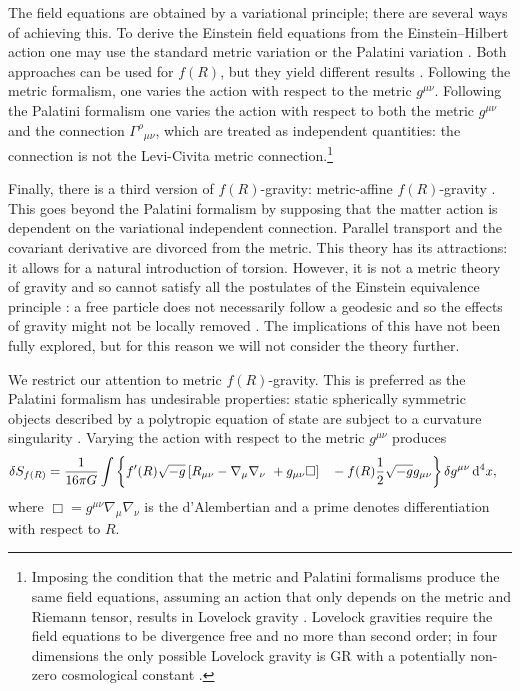 The field equations are obtained by a variational principle; there are several ways of achieving this. To derive the Einstein field equations from the Einstein--Hilbert action one may use the standard metric variation or the Palatini variation \citep[section 21.2]{Misner1973}. Both approaches can be used for $f(R)$, but they yield different results \citep{Sotiriou2010, DeFelice2010}. Following the metric formalism, one varies the action with respect to the metric $g^{\mu\nu}$. Following the Palatini formalism one varies the action with respect to both the metric $g^{\mu\nu}$ and the connection ${\Gamma^\rho}_{\mu\nu}$, which are treated as independent quantities: the connection is not the Levi-Civita metric connection.\footnote{Imposing the condition that the metric and Palatini formalisms produce the same field equations, assuming an action that only depends on the metric and Riemann tensor, results in Lovelock gravity \citep{Exirifard2008}. Lovelock gravities require the field equations to be divergence free and no more than second order; in four dimensions the only possible Lovelock gravity is GR with a potentially non-zero cosmological constant \citep{Lovelock1970, Lovelock1971, Lovelock1972}.}

Finally, there is a third version of $f(R)$-gravity: metric-affine $f(R)$-gravity \citep{Sotiriou2007, Sotiriou2007b}. This goes beyond the Palatini formalism by supposing that the matter action is dependent on the variational independent connection. Parallel transport and the covariant derivative are divorced from the metric. This theory has its attractions: it allows for a natural introduction of torsion. However, it is not a metric theory of gravity and so cannot satisfy all the postulates of the Einstein equivalence principle \citep{Will2006}: a free particle does not necessarily follow a geodesic and so the effects of gravity might not be locally removed \citep{Exirifard2008}. The implications of this have not been fully explored, but for this reason we will not consider the theory further.

We restrict our attention to metric $f(R)$-gravity. This is preferred as the Palatini formalism has undesirable properties: static spherically symmetric objects described by a polytropic equation of state are subject to a curvature singularity \citep{Barausse2008b, Barausse2008a, DeFelice2010}. Varying the action with respect to the metric $g^{\mu\nu}$ produces
\begin{align}
\delta S_{f(R)} = {} & \recip{16\pi G}\int\left\{f'(R)\sqrt{-g}\left[R_{\mu\nu} - \nabla_\mu\nabla_\nu\ + g_{\mu\nu}\Box\right] \hphantom{\dfrac{0}{0}} \vphantom{\dfrac{0}{0}} - f(R)\recip{2}\sqrt{-g}g_{\mu\nu}\right\}\delta g^{\mu\nu}\,\dd^4x,
\end{align}
where $\Box = g^{\mu\nu}\nabla_\mu\nabla_\nu$ is the d'Alembertian and a prime denotes differentiation with respect to $R$.

